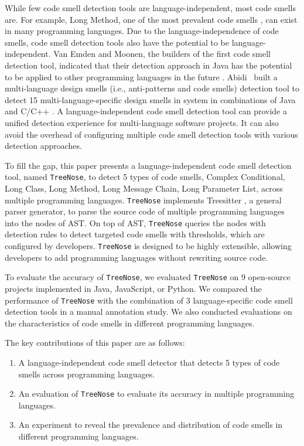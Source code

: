 While few code smell detection tools are language-independent, most code smells
are. For example, Long Method, one of the most prevalent code smells
\cite{developersCare}, can exist in many programming languages. Due to the
language-independence of code smells, code smell detection tools also have the
potential to be language-independent. Van Emden and Moonen, the builders of the
first code smell detection tool, indicated that their detection approach in Java
has the potential to be applied to other programming languages in the future
\cite{1173068}. Abidi~\etal{} built a multi-language design smells (i.e.,
anti-patterns and code smells) detection tool to detect 15
multi-language-specific design smells in system in combinations of Java and
C/C++ \cite{MultiLanguageCodeSmells,Fault-Prone}. A language-independent code
smell detection tool can provide a unified detection experience for
multi-language software projects. It can also avoid the overhead of configuring
multiple code smell detection tools with various detection approaches.

To fill the gap, this paper presents a language-independent code smell detection
tool, named \texttt{TreeNose}, to detect 5 types of code smells, Complex
Conditional, Long Class, Long Method, Long Message Chain, Long Parameter List,
across multiple programming languages. \texttt{TreeNose} implements Treesitter
\cite{treeSitter}, a general parser generator, to parse the source code of
multiple programming languages into the nodes of AST. On top of AST,
\texttt{TreeNose} queries the nodes with detection rules to detect targeted code
smells with thresholds, which are configured by developers. \texttt{TreeNose} is
designed to be highly extensible, allowing developers to add programming
languages without rewriting source code.

To evaluate the accuracy of \texttt{TreeNose}, we evaluated \texttt{TreeNose} on
9 open-source projects implemented in Java, JavaScript, or Python. We compared
the performance of \texttt{TreeNose} with the combination of 3 language-specific
code smell detection tools in a manual annotation study. We also conducted
evaluations on the characteristics of code smells in different programming
languages.

The key contributions of this paper are as follows:

\begin{enumerate}

    \item A language-independent code smell detector that detects 5 types of
        code smells across programming languages.

    \item An evaluation of \texttt{TreeNose} to evaluate its accuracy in
        multiple programming languages.

    \item An experiment to reveal the prevalence and distribution of code smells
        in different programming languages.

\end{enumerate}

